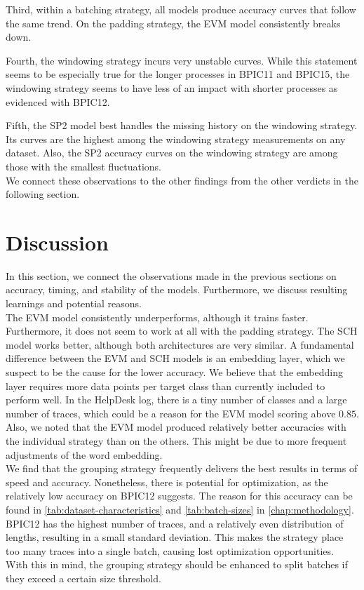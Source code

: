 Third, within a batching strategy, all models produce accuracy curves that follow the same trend.
On the padding strategy, the EVM model consistently breaks down.

Fourth, the windowing strategy incurs very unstable curves.
While this statement seems to be especially true for the longer processes in BPIC11 and BPIC15, the windowing strategy seems to have less of an impact with shorter processes as evidenced with BPIC12.

Fifth, the SP2 model best handles the missing history on the windowing strategy.
Its curves are the highest among the windowing strategy measurements on any dataset.
Also, the SP2 accuracy curves on the windowing strategy are among those with the smallest fluctuations.\\

We connect these observations to the other findings from the other verdicts in the following section.

\section{Discussion}\label{sec:eval:discussion}
In this section, we connect the observations made in the previous sections on accuracy, timing, and stability of the models.
Furthermore, we discuss resulting learnings and potential reasons.\\

The EVM model consistently underperforms, although it trains faster.
Furthermore, it does not seem to work at all with the padding strategy.
The SCH model works better, although both architectures are very similar.
A fundamental difference between the EVM and SCH models is an embedding layer, which we suspect to be the cause for the lower accuracy.
We believe that the embedding layer requires more data points per target class than currently included to perform well.
In the HelpDesk log, there is a tiny number of classes and a large number of traces, which could be a reason for the EVM model scoring above $0.85$.
Also, we noted that the EVM model produced relatively better accuracies with the individual strategy than on the others.
This might be due to more frequent adjustments of the word embedding.\\

We find that the grouping strategy frequently delivers the best results in terms of speed and accuracy.
Nonetheless, there is potential for optimization, as the relatively low accuracy on BPIC12 suggests.
The reason for this accuracy can be found in \autoref{tab:dataset-characteristics} and \autoref{tab:batch-sizes} in \autoref{chap:methodology}.
BPIC12 has the highest number of traces, and a relatively even distribution of lengths, resulting in a small standard deviation.
This makes the strategy place too many traces into a single batch, causing lost optimization opportunities.
With this in mind, the grouping strategy should be enhanced to split batches if they exceed a certain size threshold.\\

